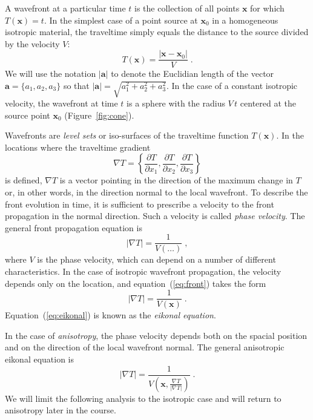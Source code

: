 \documentclass[12pt]{handout}
\begin{document}
A wavefront at a particular time $t$ is the collection of all points
$\mathbf{x}$  for which $T(\mathbf{x}) = t$. In the simplest case of a
point source at $\mathbf{x}_0$ in a homogeneous isotropic material,
the traveltime simply equals the distance to the source divided by the
velocity $V$:
\begin{equation}
  \label{eq:const}
  T(\mathbf{x}) = \frac{\left|\mathbf{x}-\mathbf{x}_0\right|}{V}\;.
\end{equation}
We will use the notation $|\mathbf{a}|$ to denote the Euclidian length
of the vector $\mathbf{a}=\{a_1,a_2,a_3\}$ so that
$|\mathbf{a}|=\sqrt{a_1^2+a_2^2+a_3^2}$. In the case of a constant
isotropic velocity, the wavefront at time $t$ is a sphere with the
radius $V\,t$ centered at the source point $\mathbf{x}_0$
(Figure~\ref{fig:cone}).


Wavefronts are \emph{level sets} or iso-surfaces of the traveltime
function $T(\mathbf{x})$. In the locations where the traveltime gradient 
\[
\nabla T = \left\{
\frac{\partial T}{\partial x_1},
\frac{\partial T}{\partial x_2},
\frac{\partial T}{\partial x_3}\right\}
\]
is defined, $\nabla T$ is a vector pointing in the direction of the
maximum change in $T$ or, in other words, in the direction normal to
the local wavefront. To describe the front evolution in time, it is
sufficient to prescribe a velocity to the front propagation in the
normal direction. Such a velocity is called \emph{phase velocity}. The
general front propagation equation is
\begin{equation}
  \label{eq:front}
  \left|\nabla T\right| = \frac{1}{V(\ldots)}\;,
\end{equation}
where $V$ is the phase velocity, which can depend on a number of
different characteristics. In the case of isotropic wavefront
propagation, the velocity depends only on the location, and
equation~(\ref{eq:front}) takes the form
\begin{equation}
  \label{eq:eikonal}
  \left|\nabla T\right| = \frac{1}{V(\mathbf{x})}\;.
\end{equation}
Equation~(\ref{eq:eikonal}) is known as the \emph{eikonal equation}.

In the case of \emph{anisotropy}, the phase velocity depends both on
the spacial position and on the direction of the local wavefront
normal. The general anisotropic eikonal equation is
\begin{equation}
  \label{eq:anisoeikonal}
  \left|\nabla T\right| = 
  \frac{1}{V\left(\mathbf{x},\frac{\nabla T}{\left|\nabla T\right|}\right)}\;.
\end{equation}
We will limit the following analysis to the isotropic case and will return
to anisotropy later in the course.
\end{document}
